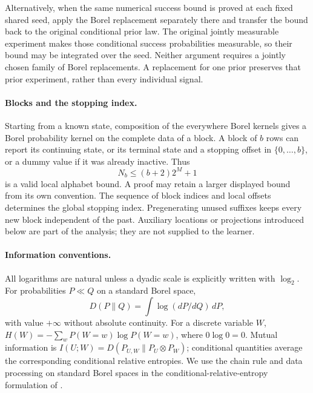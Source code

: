 Alternatively, when the same numerical success bound is proved at
each fixed shared seed, apply the Borel replacement separately there
and transfer the bound back to the original conditional prior law.
The original jointly measurable experiment makes those conditional
success probabilities measurable, so their bound may be integrated
over the seed. Neither argument requires a jointly chosen family of
Borel replacements. A replacement for one prior preserves that prior
experiment, rather than every individual signal.

\paragraph{Blocks and the stopping index.}
Starting from a known state, composition of the everywhere Borel
kernels gives a Borel probability kernel on the complete data of a
block. A block of \(b\) rows can report its continuing state, or its
terminal state and a stopping offset in \(\{0,\ldots,b\}\), or a
dummy value if it was already inactive. Thus
\[
 N_b\le (b+2)2^M+1
\]
is a valid local alphabet bound. A proof may retain a larger displayed
bound from its own convention. The sequence of block indices and local
offsets determines the global stopping index. Pregenerating unused
suffixes keeps every new block independent of the past. Auxiliary
locations or projections introduced below are part of the analysis;
they are not supplied to the learner.

\paragraph{Information conventions.}
All logarithms are natural unless a dyadic scale is explicitly written
with \(\log_2\). For probabilities \(P\ll Q\) on a standard Borel
space,
\[
 D(P\|Q)=\int\log(dP/dQ)\,dP,
\]
with value \(+\infty\) without absolute continuity. For a discrete
variable \(W\), \(H(W)=-\sum_w P(W=w)\log P(W=w)\), where
\(0\log0=0\). Mutual information is
\(I(U;W)=D(P_{U,W}\|P_U\otimes P_W)\); conditional quantities average
the corresponding conditional relative entropies. We use the chain
rule and data processing on standard Borel spaces in the
conditional-relative-entropy formulation of
\cite[Lemma~3.6 and Sections~3.3--3.4]{Austin2020}.

